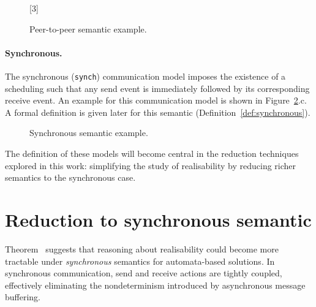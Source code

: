 \begin{figure}[!ht]
    \centering
      \begin{msc}[draw frame=none, draw head=none, msc keyword=, 
                    head height=0px, label distance=0.5ex, 
                    foot height=0px, foot distance=0px]{}

            [3]
            \nextlevel
            \nextlevel
        \end{msc}
  \caption{Peer-to-peer semantic example.}
  \label{fig:p2p}
\end{figure}

\paragraph{Synchronous.}
The synchronous (\verb|synch|) communication model imposes 
the existence of a scheduling such that any send event is 
immediately followed by its corresponding receive event. 
An example for this communication model is shown in 
Figure~\ref{fig:sync}.c. A formal definition is given later 
for this semantic (Definition~\ref{def:synchronous}).

\begin{figure}[!ht]
    \centering
      \begin{msc}[draw frame=none, draw head=none, msc keyword=, 
                  head height=0px, label distance=0.5ex, 
                  foot height=0px, foot distance=0px]{}

          \nextlevel
      \end{msc}
  \caption{Synchronous semantic example.}
  \label{fig:sync}
\end{figure}

The definition of these models will become central in
the reduction techniques explored in this work: 
simplifying the study of realisability
by reducing richer semantics to the synchronous case.

\section{Reduction to synchronous semantic}
Theorem~\cite[Theorem 5.3]{di2025realisability} suggests that reasoning
about realisability could become more tractable under \emph{synchronous}
semantics for automata-based solutions. In
synchronous communication, send and receive actions are tightly coupled,
effectively eliminating the nondeterminism introduced by asynchronous
message buffering.

